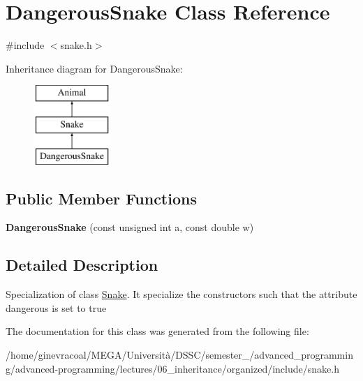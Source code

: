 \hypertarget{classDangerousSnake}{}\section{Dangerous\+Snake Class Reference}
\label{classDangerousSnake}


{\ttfamily \#include $<$snake.\+h$>$}

Inheritance diagram for Dangerous\+Snake\+:\begin{figure}[H]
\begin{center}
\leavevmode
\includegraphics[height=3.000000cm]{classDangerousSnake}
\end{center}
\end{figure}
\subsection*{Public Member Functions}
\begin{DoxyCompactItemize}
\item 
{\bfseries Dangerous\+Snake} (const unsigned int a, const double w)\hypertarget{classDangerousSnake_affea07d2d8e6bcb61ee192cca2a05838}{}\label{classDangerousSnake_affea07d2d8e6bcb61ee192cca2a05838}

\end{DoxyCompactItemize}


\subsection{Detailed Description}
Specialization of class \hyperlink{classSnake}{Snake}. It specialize the constructors such that the attribute {\ttfamily dangerous} is set to true 

The documentation for this class was generated from the following file\+:\begin{DoxyCompactItemize}
\item 
/home/ginevracoal/\+M\+E\+G\+A/\+Università/\+D\+S\+S\+C/semester\+\_/advanced\+\_\+programming/advanced-\/programming/lectures/06\+\_\+inheritance/organized/include/snake.\+h\end{DoxyCompactItemize}
